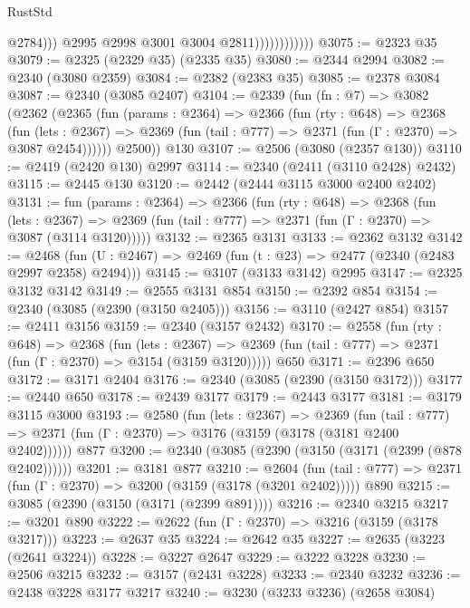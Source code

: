 \begin{lexlean}{RustStd}
\begin{coremodule}
                                  @2784)))
                            @2995
                            @2998
                            @3001
                            @3004
                            @2811))))))))))))
@3075 := @2323 @35
@3079 := @2325 (@2329 @35) (@2335 @35)
@3080 := @2344 @2994
@3082 := @2340 (@3080 @2359)
@3084 := @2382 (@2383 @35)
@3085 := @2378 @3084
@3087 := @2340 (@3085 @2407)
@3104 := @2339
    (fun (fn : @7) =>
    @3082
      (@2362
        (@2365
          (fun (params : @2364) =>
          @2366
            (fun (rty : @648) =>
            @2368
              (fun (lets : @2367) =>
              @2369 (fun (tail : @777) => @2371 (fun (Γ : @2370) => @3087 @2454))))))
        @2500))
    @130
@3107 := @2506 (@3080 (@2357 @130))
@3110 := @2419 (@2420 @130) @2997
@3114 := @2340 (@2411 (@3110 @2428) @2432)
@3115 := @2445 @130
@3120 := @2442 (@2444 @3115 @3000 @2400 @2402)
@3131 := fun (params : @2364) =>
  @2366
    (fun (rty : @648) =>
    @2368
      (fun (lets : @2367) =>
      @2369 (fun (tail : @777) => @2371 (fun (Γ : @2370) => @3087 (@3114 @3120)))))
@3132 := @2365 @3131
@3133 := @2362 @3132
@3142 := @2468 (fun (U : @2467) => @2469 (fun (t : @23) => @2477 (@2340 (@2483 @2997 @2358) @2494)))
@3145 := @3107 (@3133 @3142) @2995
@3147 := @2325 @3132 @3142
@3149 := @2555 @3131 @854
@3150 := @2392 @854
@3154 := @2340 (@3085 (@2390 (@3150 @2405)))
@3156 := @3110 (@2427 @854)
@3157 := @2411 @3156
@3159 := @2340 (@3157 @2432)
@3170 := @2558
    (fun (rty : @648) =>
    @2368
      (fun (lets : @2367) =>
      @2369 (fun (tail : @777) => @2371 (fun (Γ : @2370) => @3154 (@3159 @3120)))))
    @650
@3171 := @2396 @650
@3172 := @3171 @2404
@3176 := @2340 (@3085 (@2390 (@3150 @3172)))
@3177 := @2440 @650
@3178 := @2439 @3177
@3179 := @2443 @3177
@3181 := @3179 @3115 @3000
@3193 := @2580
    (fun (lets : @2367) =>
    @2369
      (fun (tail : @777) => @2371 (fun (Γ : @2370) => @3176 (@3159 (@3178 (@3181 @2400 @2402))))))
    @877
@3200 := @2340 (@3085 (@2390 (@3150 (@3171 (@2399 (@878 @2402))))))
@3201 := @3181 @877
@3210 := @2604
    (fun (tail : @777) => @2371 (fun (Γ : @2370) => @3200 (@3159 (@3178 (@3201 @2402)))))
    @890
@3215 := @3085 (@2390 (@3150 (@3171 (@2399 @891))))
@3216 := @2340 @3215
@3217 := @3201 @890
@3222 := @2622 (fun (Γ : @2370) => @3216 (@3159 (@3178 @3217)))
@3223 := @2637 @35
@3224 := @2642 @35
@3227 := @2635 (@3223 (@2641 @3224))
@3228 := @3227 @2647
@3229 := @3222 @3228
@3230 := @2506 @3215
@3232 := @3157 (@2431 @3228)
@3233 := @2340 @3232
@3236 := @2438 @3228 @3177 @3217
@3240 := @3230 (@3233 @3236) (@2658 @3084)

\end{coremodule}
\end{lexlean}
